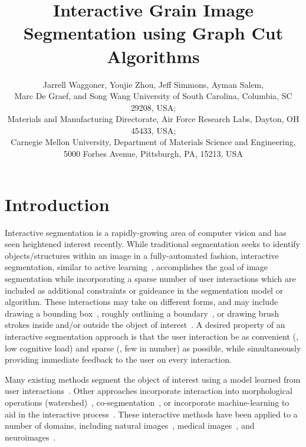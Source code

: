 \documentclass[]{spie}  %
\title{Interactive Grain Image Segmentation using Graph Cut Algorithms}
\author{Jarrell Waggoner\supit{a}, Youjie Zhou\supit{a}, Jeff Simmons\supit{b}, Ayman Salem\supit{b}, \\ Marc De Graef\supit{c}, and Song Wang\supit{a}
\skiplinehalf
\supit{a}University of South Carolina, Columbia, SC 29208, USA; \\
\supit{b}Materials and Manufacturing Directorate, Air Force Research
Labs, Dayton, OH 45433, USA; \\
\supit{c} Carnegie Mellon University, Department of Materials Science and Engineering, 5000 Forbes Avenue, Pittsburgh, PA, 15213, USA
}
\begin{document}
 
  \maketitle 

\begin{abstract}
% 

\end{abstract}




\section{Introduction}
\label{sec:intro}

Interactive segmentation is a rapidly-growing area of computer vision
and has seen heightened interest recently\cite{kuang:12,straehle:12}.
While traditional segmentation seeks to identify objects/structures
within an image in a fully-automated fashion, interactive
segmentation, similar to active learning~\cite{settles:09},
accomplishes the goal of image segmentation while incorporating a
sparse number of user interactions which are included as additional
constraints or guideance in the segmentation model or algorithm.
These interactions may take on different forms, and may include
drawing a bounding box~\cite{rother:04}, roughly outlining a
boundary~\cite{mortensen:95}, or drawing brush strokes inside and/or
outside the object of interest~\cite{santner:10, unger:08, boykov:01b,
  vezhnevets:95}.  A desired property of an interactive segmentation
approach is that the user interaction be as convenient (\ie, low
cognitive load) and sparse (\ie, few in number) as possible, while
simultaneously providing immediate feedback to the user on every
interaction.

Many existing methods segment the object of interest using a model
learned from user interactions~\cite{boykov:01b, unger:08, rother:04}.
Other approaches incorporate interaction into morphological operations
(watershed)~\cite{straehle:12}, co-segmentation~\cite{batra:10}, or
incorporate machine-learning to aid in the interactive
process~\cite{top:11, kuang:12}.  These interactive methods have been
applied to a number of domains, including natural
images~\cite{rother:04}, medical images~\cite{boykov:00}, and
neuroimages~\cite{straehle:11, straehle:12}.
\end{document}
